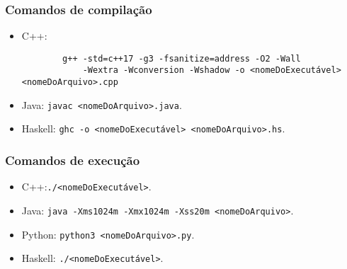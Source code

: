 \subsubsection*{Comandos de compilação}
\begin{itemize}
    \item C++: \begin{verbatim}
        g++ -std=c++17 -g3 -fsanitize=address -O2 -Wall 
            -Wextra -Wconversion -Wshadow -o <nomeDoExecutável> <nomeDoArquivo>.cpp
    \end{verbatim}
    \item Java: \verb|javac <nomeDoArquivo>.java|.
    \item Haskell: \verb|ghc -o <nomeDoExecutável> <nomeDoArquivo>.hs|.
\end{itemize}

\subsubsection*{Comandos de execução}
\begin{itemize}
    \item C++:\verb|./<nomeDoExecutável>|.
    \item Java: \verb|java -Xms1024m -Xmx1024m -Xss20m <nomeDoArquivo>|.
    \item Python: \verb|python3 <nomeDoArquivo>.py|.
    \item Haskell: \verb|./<nomeDoExecutável>|.
\end{itemize}